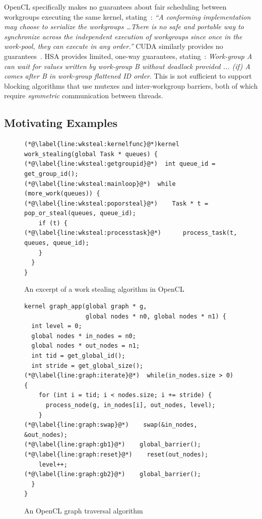 \documentclass[parskip=half,sigconf,review, anonymous=true, acmcopyrightmode=none]{acmart}
\begin{document}
OpenCL specifically makes no guarantees about fair scheduling between
workgroups executing the same kernel, stating~\cite[p.\ 31]{opencl2Spec}: \emph{``A
  conforming implementation may choose to serialize the workgroups
\dots There is no safe and portable way to synchronize across
  the independent execution of workgroups since once in the work-pool,
  they can execute in any order.''}  CUDA similarly provides no guarantees~\cite{cuda-75}.
%
HSA provides limited, one-way guarantees,
stating~\cite[p. 46]{HSAprogramming11}: \emph{Work-group A can wait
  for values written by work-group B without deadlock provided ... (if) A
  comes after B in work-group flattened ID order}. This is not sufficient to support blocking algorithms that use
mutexes and inter-workgroup barriers, both of which require \emph{symmetric} communication between
threads.


\subsection{Motivating Examples}\label{sec:openclexamples}

\begin{figure}

\begin{lstlisting}
(*@\label{line:wksteal:kernelfunc}@*)kernel work_stealing(global Task * queues) {
(*@\label{line:wksteal:getgroupid}@*)  int queue_id = get_group_id();
(*@\label{line:wksteal:mainloop}@*)  while (more_work(queues)) {
(*@\label{line:wksteal:poporsteal}@*)    Task * t = pop_or_steal(queues, queue_id);
    if (t) {
(*@\label{line:wksteal:processtask}@*)      process_task(t, queues, queue_id);
    }
  }
}
\end{lstlisting}
\caption{An excerpt of a work stealing algorithm in OpenCL}\label{fig:workstealing}
\end{figure}

\begin{figure}

\begin{lstlisting}
kernel graph_app(global graph * g,
                 global nodes * n0, global nodes * n1) {
  int level = 0;
  global nodes * in_nodes = n0;
  global nodes * out_nodes = n1;
  int tid = get_global_id();
  int stride = get_global_size();
(*@\label{line:graph:iterate}@*)  while(in_nodes.size > 0) {
    for (int i = tid; i < nodes.size; i += stride) {
      process_node(g, in_nodes[i], out_nodes, level);
    }
(*@\label{line:graph:swap}@*)    swap(&in_nodes, &out_nodes);
(*@\label{line:graph:gb1}@*)    global_barrier();
(*@\label{line:graph:reset}@*)    reset(out_nodes);
    level++;
(*@\label{line:graph:gb2}@*)    global_barrier();
  }
}
\end{lstlisting}
\caption{An OpenCL graph traversal algorithm}\label{fig:graphsearch}
\end{figure}
\end{document}
